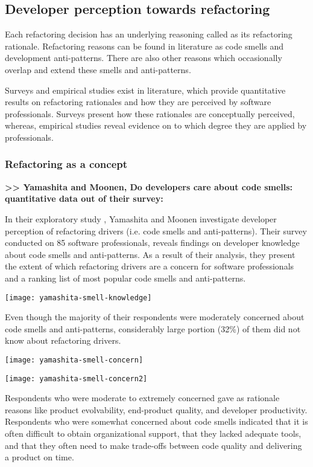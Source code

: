\subsection{Developer perception towards refactoring}
Each refactoring decision has an underlying reasoning called as its refactoring rationale. Refactoring reasons can be found in literature as code smells and development anti-patterns. There are also other reasons which occasionally overlap and extend these smells and anti-patterns.

Surveys and empirical studies exist in literature, which provide quantitative results on refactoring rationales and how they are perceived by software professionals. Surveys present how these rationales are conceptually perceived, whereas, empirical studies reveal evidence on to which degree they are applied by professionals.

\subsubsection{Refactoring as a concept}

\textbf{>> Yamashita and Moonen, Do developers care about code smells: quantitative data out of their survey:}

In their exploratory study \cite{yamashitaDevelopers}, Yamashita and Moonen investigate developer perception of refactoring drivers (i.e. code smells and anti-patterns). Their survey conducted on 85 software professionals, reveals findings on developer knowledge about code smells and anti-patterns. As a result of their analysis, they present the extent of which refactoring drivers are a concern for software professionals and a ranking list of most popular code smells and anti-patterns. 

\texttt{[image: yamashita-smell-knowledge]}

Even though the majority of their respondents were moderately concerned about code smells and anti-patterns, considerably large portion (32\%) of them did not know about refactoring drivers.

\texttt{[image: yamashita-smell-concern]}

\texttt{[image: yamashita-smell-concern2]}

Respondents who were moderate to extremely concerned gave as rationale reasons like product evolvability, end-product quality, and developer productivity. Respondents who were somewhat concerned about code smells indicated that it is often difficult to obtain organizational support, that they lacked adequate tools, and that they often need to make trade-offs between code quality and delivering a product on time.

